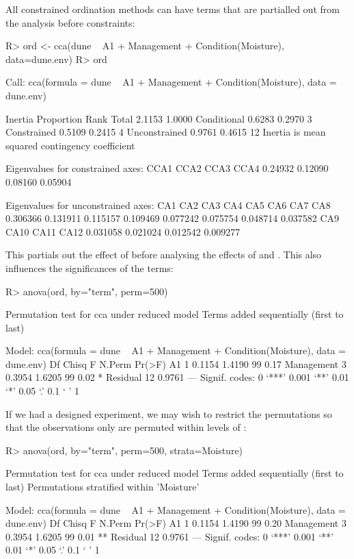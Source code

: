 \documentclass[article,nojss]{jss}
\begin{document}
All constrained ordination methods can have terms that are partialled
out from the analysis before constraints:
\begin{Schunk}
\begin{Sinput}
R> ord <- cca(dune ~ A1 + Management + Condition(Moisture), data=dune.env)
R> ord
\end{Sinput}
\begin{Soutput}
Call: cca(formula = dune ~ A1 + Management +
Condition(Moisture), data = dune.env)

              Inertia Proportion Rank
Total          2.1153     1.0000     
Conditional    0.6283     0.2970    3
Constrained    0.5109     0.2415    4
Unconstrained  0.9761     0.4615   12
Inertia is mean squared contingency coefficient 

Eigenvalues for constrained axes:
   CCA1    CCA2    CCA3    CCA4 
0.24932 0.12090 0.08160 0.05904 

Eigenvalues for unconstrained axes:
     CA1      CA2      CA3      CA4      CA5      CA6      CA7      CA8 
0.306366 0.131911 0.115157 0.109469 0.077242 0.075754 0.048714 0.037582 
     CA9     CA10     CA11     CA12 
0.031058 0.021024 0.012542 0.009277 
\end{Soutput}
\end{Schunk}
This partials out the effect of  before analysing the
effects of  and .  This also influences
the significances of the terms:
\begin{Schunk}
\begin{Sinput}
R> anova(ord, by="term", perm=500)
\end{Sinput}
\begin{Soutput}
Permutation test for cca under reduced model
Terms added sequentially (first to last)

Model: cca(formula = dune ~ A1 + Management + Condition(Moisture), data = dune.env)
           Df  Chisq      F N.Perm Pr(>F)  
A1          1 0.1154 1.4190     99   0.17  
Management  3 0.3954 1.6205     99   0.02 *
Residual   12 0.9761                       
---
Signif. codes:  0 ‘***’ 0.001 ‘**’ 0.01 ‘*’ 0.05 ‘.’ 0.1 ‘ ’ 1 
\end{Soutput}
\end{Schunk}
If we had a designed experiment, we may wish to restrict the
permutations so that the observations only are permuted within levels
of :
\begin{Schunk}
\begin{Sinput}
R> anova(ord, by="term", perm=500, strata=Moisture)
\end{Sinput}
\begin{Soutput}
Permutation test for cca under reduced model
Terms added sequentially (first to last)
Permutations stratified within 'Moisture'

Model: cca(formula = dune ~ A1 + Management + Condition(Moisture), data = dune.env)
           Df  Chisq      F N.Perm Pr(>F)   
A1          1 0.1154 1.4190     99   0.20   
Management  3 0.3954 1.6205     99   0.01 **
Residual   12 0.9761                        
---
Signif. codes:  0 ‘***’ 0.001 ‘**’ 0.01 ‘*’ 0.05 ‘.’ 0.1 ‘ ’ 1 
\end{Soutput}
\end{Schunk}

\end{document}

